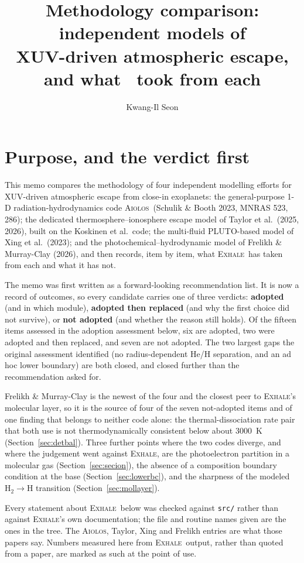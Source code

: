 \documentclass[english,a4paper]{my_memo}
\title{Methodology comparison: independent models of\\
XUV-driven atmospheric escape, and what \EXHALE\ took from each}
\author{Kwang-Il Seon}
\newcommand{\EXHALE}{\textsc{Exhale}}
\newcommand{\AIOLOS}{\textsc{Aiolos}}
\newcommand{\Htwo}{\ensuremath{\mathrm{H}_2}}
\begin{document}
\maketitle

\section{Purpose, and the verdict first}

This memo compares the methodology of four independent modelling efforts for
XUV-driven atmospheric escape from close-in exoplanets: the general-purpose
1-D radiation-hydrodynamics code \AIOLOS\ (Schulik \& Booth 2023, MNRAS 523,
286); the dedicated thermosphere--ionosphere escape model of Taylor et al.\
(2025, 2026), built on the Koskinen et al.\ code; the multi-fluid PLUTO-based
model of Xing et al.\ (2023); and the photochemical--hydrodynamic model of
Frelikh \& Murray-Clay (2026), and then records, item by item, what
\EXHALE\ has taken from each and what it has not.

The memo was first written as a forward-looking recommendation list. It is now
a record of outcomes, so every candidate carries one of three verdicts:
\textbf{adopted} (and in which module), \textbf{adopted then replaced} (and
why the first choice did not survive), or \textbf{not adopted} (and whether the
reason still holds). Of the fifteen items assessed in the adoption assessment
below, six are adopted, two were adopted and then replaced, and seven are not
adopted. The two largest gaps the original assessment identified (no
radius-dependent He/H separation, and an ad hoc lower boundary) are both
closed, and closed further than the recommendation asked for.

Frelikh \& Murray-Clay is the newest of the four and the closest peer to
\EXHALE's molecular layer, so it is the source of four of the seven
not-adopted items and of one finding that belongs to neither code alone: the
thermal-dissociation rate pair that both use is not thermodynamically
consistent below about 3000~K (Section~\ref{sec:detbal}). Three further points
where the two codes diverge, and where the judgement went against \EXHALE, are
the photoelectron partition in a molecular gas (Section~\ref{sec:secion}), the
absence of a composition boundary condition at the base
(Section~\ref{sec:lowerbc}), and the sharpness of the modeled
\Htwo$\rightarrow$H transition (Section~\ref{sec:mollayer}).

Every statement about \EXHALE\ below was checked against \texttt{src/} rather
than against \EXHALE's own documentation; the file and routine names given are
the ones in the tree. The \AIOLOS, Taylor, Xing and Frelikh entries are what
those papers say. Numbers measured here from \EXHALE\ output, rather than
quoted from a paper, are marked as such at the point of use.
\end{document}

